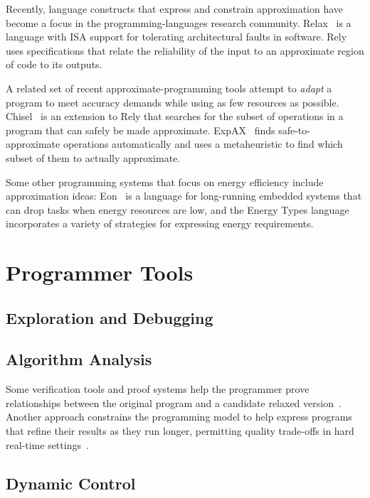 Recently, language constructs that express and constrain
approximation have become a focus in the programming-languages research
community.
Relax~\cite{relax} is a language with ISA support for tolerating architectural
faults in software.
Rely~\cite{rely} uses specifications that relate the reliability of the input
to an approximate region of code to its outputs.

A related set of recent approximate-programming tools attempt to \emph{adapt}
a program to meet accuracy demands while using as few resources as possible.
Chisel~\cite{chisel} is an extension to Rely that searches for the subset of
operations in a program that can safely be made approximate.
ExpAX~\cite{expax-tr} finds safe-to-approximate operations automatically and
uses a metaheuristic to find which subset of them to actually approximate.

Some other programming systems that focus on energy efficiency include
approximation ideas:
Eon~\cite{eon} is a language for long-running embedded systems that can drop
tasks when energy resources are low,
and the Energy Types language~\cite{energytypes} incorporates a variety of
strategies for expressing energy requirements.


\section{Programmer Tools}

\subsection{Exploration and Debugging}

\cite{approxdebug}

\cite{qosprof}

\subsection{Algorithm Analysis}

Some verification tools and proof systems help
the programmer prove relationships between the original program and a
candidate relaxed version~\cite{carbin-pldi, carbin-races, carbin-pepm,
rice-transformation-semantics}.
Another approach constrains the programming model to help express programs
that refine their results as they run longer, permitting quality trade-offs in
hard real-time settings~\cite{chung90}.

\subsection{Dynamic Control}


